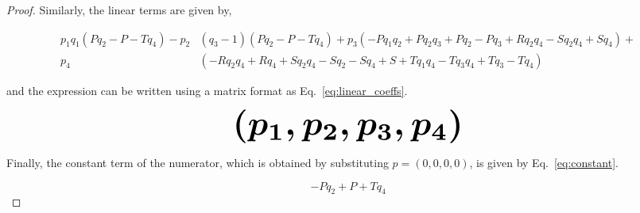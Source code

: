 \documentclass[10pt]{article}
\providecommand{\DIFaddbegin}{} %
\providecommand{\DIFaddend}{} %
\providecommand{\DIFdelbegin}{} %
\providecommand{\DIFdelend}{} %
\newcommand{\DIFscaledelfig}{0.5}
\newlength{\DIFdelgraphicswidth} %
\newlength{\DIFdelgraphicsheight} %
\newcommand{\DIFaddincludegraphics}[2][]{{\color{blue}\fbox{\DIFOincludegraphics[#1]{#2}}}} %
\newcommand{\DIFdelincludegraphics}[2][]{%
\sbox{\DIFdelgraphicsbox}{\DIFOincludegraphics[#1]{#2}}%
\settoboxwidth{\DIFdelgraphicswidth}{\DIFdelgraphicsbox} %
\settoboxtotalheight{\DIFdelgraphicsheight}{\DIFdelgraphicsbox} %
\scalebox{\DIFscaledelfig}{%
\parbox[b]{\DIFdelgraphicswidth}{\usebox{\DIFdelgraphicsbox}\\[-\baselineskip] \rule{\DIFdelgraphicswidth}{0em}}\llap{\resizebox{\DIFdelgraphicswidth}{\DIFdelgraphicsheight}{%
\setlength{\unitlength}{\DIFdelgraphicswidth}%
\begin{picture}(1,1)%
\thicklines\linethickness{2pt} %
{\color[rgb]{1,0,0}\put(0,0){\framebox(1,1){}}}%
{\color[rgb]{1,0,0}\put(0,0){\line( 1,1){1}}}%
{\color[rgb]{1,0,0}\put(0,1){\line(1,-1){1}}}%
\end{picture}%
}\hspace*{3pt}}} %
} %
\DeclareRobustCommand{\DIFaddbegin}{\DIFOaddbegin \let\includegraphics\DIFaddincludegraphics} %
\DeclareRobustCommand{\DIFaddend}{\DIFOaddend \let\includegraphics\DIFOincludegraphics} %
\DeclareRobustCommand{\DIFdelbegin}{\DIFOdelbegin \let\includegraphics\DIFdelincludegraphics} %
\DeclareRobustCommand{\DIFdelend}{\DIFOaddend \let\includegraphics\DIFOincludegraphics} %
\begin{document}
\begin{proof}
    Similarly, the linear terms are given by,

    \begingroup
    \footnotesize
    \DIFdelbegin %
\DIFdelend \DIFaddbegin \begin{align*}
    p_{1} q_{1} (P q_{2} - P - T q_{4}) - p_{2} & (q_{3} - 1) (P q_{2} - P - T q_{4}) + p_{3} (- P q_{1} q_{2} + P q_{2} q_{3} + P q_{2} - P q_{3} + R q_{2} q_{4} - S q_{2} q_{4} + S q_{4}) + \\
    p_{4} & (- R q_{2} q_{4} + R q_{4} + S q_{2} q_{4} - S q_{2} - S q_{4} + S + T q_{1} q_{4} - T q_{3} q_{4} + T q_{3} - T q_{4})
    \end{align*}\DIFaddend 
    \endgroup

    and the expression can be written using a matrix format as
    Eq.~\ref{eq:linear_coeffs}.

    \DIFdelbegin %
\DIFdelend \DIFaddbegin \begin{equation}\label{eq:linear_coeffs}
        \resizebox{0.60\linewidth}{!}{\arraycolsep=2.5pt%
        \boldmath\(
        (p_1, p_2, p_3, p_4) \)}
    \end{equation}\DIFaddend 

    Finally, the constant term of the numerator, which is obtained by
    substituting $p=(0, 0, 0, 0)$, is given by Eq.~\ref{eq:constant}.

    \DIFdelbegin %
\DIFdelend \DIFaddbegin \begin{equation}\label{eq:constant}
    - P q_{2} + P + T q_{4}
    \end{equation}\DIFaddend 


\end{proof}
\end{document}
